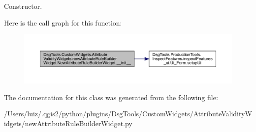 \begin{DoxyVerb}Constructor.\end{DoxyVerb}
 Here is the call graph for this function\+:
\nopagebreak
\begin{figure}[H]
\begin{center}
\leavevmode
\includegraphics[width=350pt]{class_dsg_tools_1_1_custom_widgets_1_1_attribute_validity_widgets_1_1new_attribute_rule_builder_3a2b8c8cd1a59db9d7af938ad35eab8c_a0bbf8c7a87c5e841e0f4f25193af2d6e_cgraph}
\end{center}
\end{figure}


The documentation for this class was generated from the following file\+:\begin{DoxyCompactItemize}
\item 
/\+Users/luiz/.\+qgis2/python/plugins/\+Dsg\+Tools/\+Custom\+Widgets/\+Attribute\+Validity\+Widgets/new\+Attribute\+Rule\+Builder\+Widget.\+py\end{DoxyCompactItemize}
